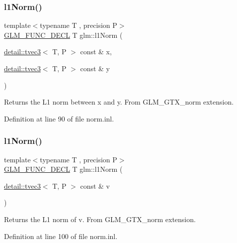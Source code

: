\subsubsection{\texorpdfstring{l1\+Norm()}{l1Norm()}\hspace{0.1cm}{\footnotesize\ttfamily [1/2]}}
{\footnotesize\ttfamily template$<$typename T , precision P$>$ \\
\hyperlink{setup_8hpp_ab2d052de21a70539923e9bcbf6e83a51}{G\+L\+M\+\_\+\+F\+U\+N\+C\+\_\+\+D\+E\+CL} T glm\+::l1\+Norm (\begin{DoxyParamCaption}\item[{\hyperlink{structglm_1_1detail_1_1tvec3}{detail\+::tvec3}$<$ T, P $>$ const \&}]{x,  }\item[{\hyperlink{structglm_1_1detail_1_1tvec3}{detail\+::tvec3}$<$ T, P $>$ const \&}]{y }\end{DoxyParamCaption})}

Returns the L1 norm between x and y. From G\+L\+M\+\_\+\+G\+T\+X\+\_\+norm extension. 

Definition at line 90 of file norm.\+inl.

\mbox{\label{group__gtx__norm_ga466d01e7b4350f44250d80ec48128fbd}} 
\subsubsection{\texorpdfstring{l1\+Norm()}{l1Norm()}\hspace{0.1cm}{\footnotesize\ttfamily [2/2]}}
{\footnotesize\ttfamily template$<$typename T , precision P$>$ \\
\hyperlink{setup_8hpp_ab2d052de21a70539923e9bcbf6e83a51}{G\+L\+M\+\_\+\+F\+U\+N\+C\+\_\+\+D\+E\+CL} T glm\+::l1\+Norm (\begin{DoxyParamCaption}\item[{\hyperlink{structglm_1_1detail_1_1tvec3}{detail\+::tvec3}$<$ T, P $>$ const \&}]{v }\end{DoxyParamCaption})}

Returns the L1 norm of v. From G\+L\+M\+\_\+\+G\+T\+X\+\_\+norm extension. 

Definition at line 100 of file norm.\+inl.

\mbox{\label{group__gtx__norm_ga46af6669c4e8b042e284dd3b6c0caf28}} 
